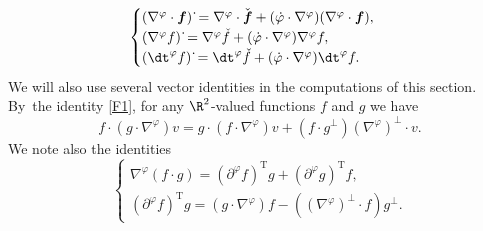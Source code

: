 \begin{equation}\label{linearization 2}
\begin{cases}
(\nabla^\varphi \cdot \mbox{\boldmath$f$})\,\dot{}
= \nabla^\varphi \cdot \check{\mbox{\boldmath$f$}}
+ (\dot{\varphi} \cdot \nabla^\varphi)(\nabla^\varphi \cdot \mbox{\boldmath$f$}), \\
(\nabla^\varphi f)\,\dot{}
= \nabla^\varphi \check{f} + (\dot{\varphi} \cdot \nabla^\varphi)\nabla^\varphi f, \\
(\dt^\varphi f)\,\dot{}
= \dt^\varphi\check{f} + (\dot{\varphi} \cdot \nabla^\varphi)\dt^\varphi f.
\end{cases}
\end{equation}
We will also use several vector identities in the computations of this section. By~the identity \eqref{F1}, for any $\R^2$-valued functions $f$ and $g$ we have
\begin{equation}\label{F2}
f\cdot(g\cdot\nabla^\varphi)v = g\cdot(f\cdot\nabla^\varphi)v+(f\cdot g^\perp)(\nabla^\varphi)^\perp\cdot v.
\end{equation}
We note also the identities
\begin{equation}\label{F3}
\begin{cases}
\nabla^\varphi(f\cdot g) = (\partial^\varphi f)^\mathrm{T}g + (\partial^\varphi g)^\mathrm{T}f, \\
(\partial^\varphi f)^\mathrm{T}g = (g\cdot\nabla^\varphi)f - ((\nabla^\varphi)^\perp\cdot f)g^\perp.
\end{cases}
\end{equation}

